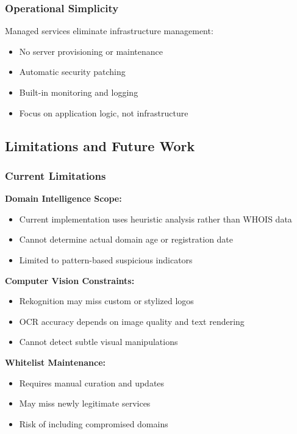 \documentclass[conference]{IEEEtran}
\begin{document}
\subsubsection{Operational Simplicity}

Managed services eliminate infrastructure management:
\begin{itemize}
\item No server provisioning or maintenance
\item Automatic security patching
\item Built-in monitoring and logging
\item Focus on application logic, not infrastructure
\end{itemize}

\subsection{Limitations and Future Work}

\subsubsection{Current Limitations}

\textbf{Domain Intelligence Scope:}
\begin{itemize}
\item Current implementation uses heuristic analysis rather than WHOIS data
\item Cannot determine actual domain age or registration date
\item Limited to pattern-based suspicious indicators
\end{itemize}

\textbf{Computer Vision Constraints:}
\begin{itemize}
\item Rekognition may miss custom or stylized logos
\item OCR accuracy depends on image quality and text rendering
\item Cannot detect subtle visual manipulations
\end{itemize}

\textbf{Whitelist Maintenance:}
\begin{itemize}
\item Requires manual curation and updates
\item May miss newly legitimate services
\item Risk of including compromised domains
\end{itemize}
\end{document}
